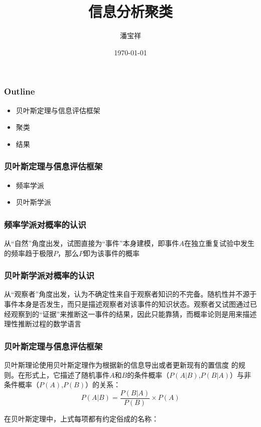 \documentclass{beamer}
\begin{document}
\begin{CJK}{UTF8}{gkai}
\title{信息分析聚类}
\date{\today}
\author{潘宝祥}
\maketitle

\begin{frame}
\frametitle{Outline}
\begin{itemize}
\item 贝叶斯定理与信息评估框架
\item 聚类
\item 结果
\end{itemize}
\end{frame}



\begin{frame}
\frametitle{贝叶斯定理与信息评估框架}
\begin{itemize}
\item 频率学派
\item 贝叶斯学派
\end{itemize}
\end{frame}
\begin{frame}
\frametitle{频率学派对概率的认识}
从``自然''角度出发，试图直接为``事件''本身建模，即事件$A$在独立重复试验中发生的频率趋于极限$P$，那么$P$即为该事件的概率
\end{frame}

\begin{frame}
\frametitle{贝叶斯学派对概率的认识}
从``观察者''角度出发，认为不确定性来自于观察者知识的不完备。随机性并不源于事件本身是否发生，而只是描述观察者对该事件的知识状态。观察者又试图通过已经观察到的``证据''来推断这一事件的结果，因此只能靠猜，而概率论则是用来描述理性推断过程的数学语言
\end{frame}

\begin{frame}
\frametitle{贝叶斯定理与信息评估框架}
贝叶斯理论使用贝叶斯定理作为根据新的信息导出或者更新现有的置信度
的规则。在形式上，它描述了随机事件$A$和$B$的条件概率（$P(A|B)$,$P(B|A)$）与非条件概率（$P(A)$,$P(B)$）的关系：
\begin{equation}
\label{bayes}
P(A|B) = \frac{P(B | A)}{P(B)}\times  P(A)
\end{equation}

\end{frame}


\begin{frame}
在贝叶斯定理中，上式每项都有约定俗成的名称：


\end{frame}
\end{CJK}
\end{document}
